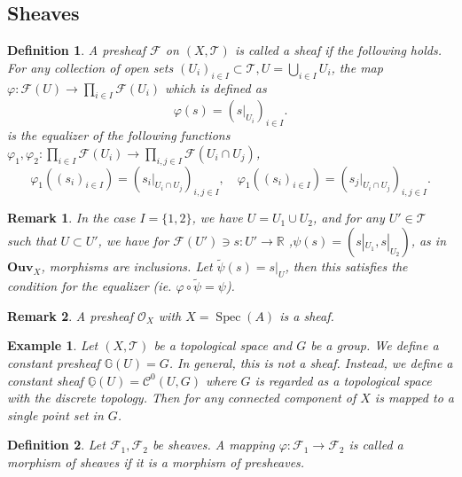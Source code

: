 \documentclass{article}
\newtheorem{definition}{Definition}[section]
\newtheorem{remark}{Remark}[section]
\newtheorem{example}{Example}[section]
\numberwithin{equation}{section}
\DeclareMathOperator{\Spec}{Spec}
\begin{document}
\subsection{Sheaves}

\begin{definition}
A presheaf $\mathcal{F}$ on $(X,\mathcal{T})$ is called a sheaf if the following holds.
For any collection of open sets $(U_i)_{i\in I}\subset \mathcal{T},U=\bigcup_{i\in I}U_i$, the map $\varphi:\mathcal{F}(U)\to\prod_{i\in I}\mathcal{F}(U_i)$ which is defined as
\begin{equation*}
\varphi(s) = (s|_{U_i})_{i\in I}.
\end{equation*}
is the equalizer of the following functions $\varphi_1,\varphi_2:\prod_{i\in I}\mathcal{F}(U_i)\to\prod_{i,j\in I}\mathcal{F}(U_i\cap U_j)$, 
\begin{equation*}
\varphi_1((s_i)_{i\in I}) = (s_i|_{U_i\cap U_j})_{i,j\in I},\quad\varphi_1((s_i)_{i\in I}) = (s_j|_{U_i\cap U_j})_{i,j\in I}.
\end{equation*}
\end{definition}

\begin{remark}
In the case $I=\{1,2\}$, we have $U=U_1\cup U_2$, and for any $U'\in\mathcal{T}$ such that $U\subset U'$, we have for $\mathcal{F}(U')\ni s:U'\to\mathbb{R}$ ,$\psi(s) = (s|_{U_1},s|_{U_2})$, as in $\mathbf{Ouv}_X$, morphisms are inclusions. Let $\tilde{\psi}(s) = s|_{U}$, then this satisfies the condition for the equalizer (ie. $\varphi\circ\tilde{\psi}=\psi$). 
\end{remark}

\begin{remark}
A presheaf $\mathcal{O}_X$ with $X=\Spec(A)$ is a sheaf.
\end{remark}

\begin{example}
Let $(X,\mathcal{T})$ be a topological space and $G$ be a group. We define a constant presheaf $\mathbb{G}(U) = G$. In general, this is not a sheaf. Instead, we define a constant sheaf $\underline{\mathbb{G}}(U) = \mathcal{C}^0(U,G)$ where $G$ is regarded as a topological space with the discrete topology. Then for any connected component of $X$ is mapped to a single point set in $G$.
\end{example}

\begin{definition}
Let $\mathcal{F}_1,\mathcal{F}_2$ be sheaves. A mapping $\varphi:\mathcal{F}_1\to\mathcal{F}_2$ is called a morphism of sheaves if it is a morphism of presheaves.
\end{definition}
\end{document}
